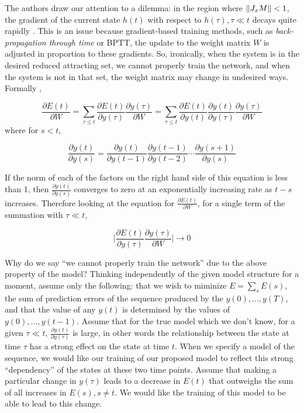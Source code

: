 The authors draw our attention to a dilemma: in the region where $\left\lVert J_x M \right\rVert < 1$, the gradient of the current state $h(t)$ with respect to $h(\tau), \tau \ll t$ decays quite rapidly \cite{Hochreiter2001}. This is an issue because gradient-based training methods, such as \emph{back-propagation through time} or BPTT, the update to the weight matrix $W$ is adjusted in proportion to these gradients. So, ironically, when the system is in the desired reduced attracting set, we cannot properly train the network, and when the system is not in that set, the weight matrix may change in undesired ways. Formally \cite{Hochreiter2001},

\begin{equation*}
  \frac{\partial E(t)}{\partial W} = \sum_{\tau \leq t} \frac{\partial E(t)}{\partial y(\tau)} \frac{\partial y(\tau)}{\partial W} = \sum_{\tau \leq t} \frac{\partial E(t)}{\partial y(t)} \frac{\partial y(t)}{\partial y(\tau)} \frac{\partial y(\tau)}{\partial W}
\end{equation*}
%
where for $s < t$,

\begin{equation*}
\frac{\partial y(t)}{\partial y(s)} = \frac{\partial y(t)}{\partial y(t-1)} \frac{\partial y(t-1)}{\partial y(t-2)} \cdots \frac{\partial y(s+1)}{\partial y(s)}
\end{equation*}

If the norm of each of the factors on the right hand side of this equation is less than 1, then $\frac{\partial y(t)}{\partial y(s)}$ converges to zero at an exponentially increasing rate as $t - s$ increases. Therefore looking at the equation for $\frac{\partial E(t)}{\partial W}$, for a single term of the summation with $\tau \ll t$,

\begin{equation*}
\biggl\lvert \frac{\partial E(t)}{\partial y(\tau)} \frac{\partial y(\tau)}{\partial W} \biggr\rvert \to 0
\end{equation*}

Why do we say ``we cannot properly train the network'' due to the above property of the model? Thinking independently of the given model structure for a moment, assume only the following: that we wish to miminize $E = \sum_{s} E(s)$, the sum of prediction errors of the sequence produced by the $y(0), \ldots, y(T)$, and that the value of any $y(t)$ is determined by the values of $y(0), \ldots, y(t-1)$. Assume that for the true model which we don't know, for a given $\tau \ll t$, $\frac{\partial y(t)}{\partial y(\tau)}$ is large, in other words the relationship between the state at time $\tau$ has a strong effect on the state at time $t$. When we specify a model of the sequence, we would like our training of our proposed model to reflect this strong ``dependency'' of the states at these two time points. Assume that making a particular change in $y(\tau)$ leads to a decrease in $E(t)$ that outweighs the sum of all increases in $E(s), s \neq t$. We would like the training of this model to be able to lead to this change.

